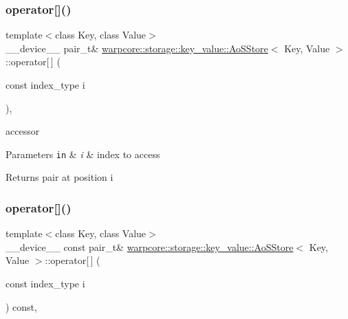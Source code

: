 \subsubsection{\texorpdfstring{operator[]()}{operator[]()}\hspace{0.1cm}{\footnotesize\ttfamily [1/2]}}
{\footnotesize\ttfamily template$<$class Key, class Value$>$ \\
\+\_\+\+\_\+device\+\_\+\+\_\+ pair\+\_\+t\& \hyperlink{classwarpcore_1_1storage_1_1key__value_1_1AoSStore}{warpcore\+::storage\+::key\+\_\+value\+::\+Ao\+S\+Store}$<$ Key, Value $>$\+::operator\mbox{[}$\,$\mbox{]} (\begin{DoxyParamCaption}\item[{const index\+\_\+type}]{i }\end{DoxyParamCaption})\hspace{0.3cm}{\ttfamily [inline]}, {\ttfamily [noexcept]}}



accessor 


\begin{DoxyParams}[1]{Parameters}
\mbox{\tt in}  & {\em i} & index to access \\
\hline
\end{DoxyParams}
\begin{DoxyReturn}{Returns}
pair at position {\ttfamily i} 
\end{DoxyReturn}
\mbox{\label{classwarpcore_1_1storage_1_1key__value_1_1AoSStore_abbae46c24d02a8a0bb74322496658d1b}} 
\subsubsection{\texorpdfstring{operator[]()}{operator[]()}\hspace{0.1cm}{\footnotesize\ttfamily [2/2]}}
{\footnotesize\ttfamily template$<$class Key, class Value$>$ \\
\+\_\+\+\_\+device\+\_\+\+\_\+ const pair\+\_\+t\& \hyperlink{classwarpcore_1_1storage_1_1key__value_1_1AoSStore}{warpcore\+::storage\+::key\+\_\+value\+::\+Ao\+S\+Store}$<$ Key, Value $>$\+::operator\mbox{[}$\,$\mbox{]} (\begin{DoxyParamCaption}\item[{const index\+\_\+type}]{i }\end{DoxyParamCaption}) const\hspace{0.3cm}{\ttfamily [inline]}, {\ttfamily [noexcept]}}



